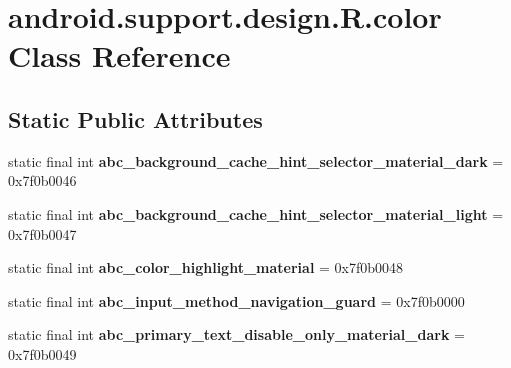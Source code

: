 \hypertarget{classandroid_1_1support_1_1design_1_1_r_1_1color}{}\section{android.\+support.\+design.\+R.\+color Class Reference}
\label{classandroid_1_1support_1_1design_1_1_r_1_1color}
\subsection*{Static Public Attributes}
\begin{DoxyCompactItemize}
\item 
\hypertarget{classandroid_1_1support_1_1design_1_1_r_1_1color_a3bc2369d5b8b40574722eba1c4ed66e8}{}static final int {\bfseries abc\+\_\+background\+\_\+cache\+\_\+hint\+\_\+selector\+\_\+material\+\_\+dark} = 0x7f0b0046\label{classandroid_1_1support_1_1design_1_1_r_1_1color_a3bc2369d5b8b40574722eba1c4ed66e8}

\item 
\hypertarget{classandroid_1_1support_1_1design_1_1_r_1_1color_a836a7fae9079ef65b027b79704cebc14}{}static final int {\bfseries abc\+\_\+background\+\_\+cache\+\_\+hint\+\_\+selector\+\_\+material\+\_\+light} = 0x7f0b0047\label{classandroid_1_1support_1_1design_1_1_r_1_1color_a836a7fae9079ef65b027b79704cebc14}

\item 
\hypertarget{classandroid_1_1support_1_1design_1_1_r_1_1color_aa538e5e8510d682489fe209c4455e24a}{}static final int {\bfseries abc\+\_\+color\+\_\+highlight\+\_\+material} = 0x7f0b0048\label{classandroid_1_1support_1_1design_1_1_r_1_1color_aa538e5e8510d682489fe209c4455e24a}

\item 
\hypertarget{classandroid_1_1support_1_1design_1_1_r_1_1color_a6bc1f7e07ac7632cfbed86d43f972968}{}static final int {\bfseries abc\+\_\+input\+\_\+method\+\_\+navigation\+\_\+guard} = 0x7f0b0000\label{classandroid_1_1support_1_1design_1_1_r_1_1color_a6bc1f7e07ac7632cfbed86d43f972968}

\item 
\hypertarget{classandroid_1_1support_1_1design_1_1_r_1_1color_ad8fbdd5eadbb720a1389509088e6feeb}{}static final int {\bfseries abc\+\_\+primary\+\_\+text\+\_\+disable\+\_\+only\+\_\+material\+\_\+dark} = 0x7f0b0049\label{classandroid_1_1support_1_1design_1_1_r_1_1color_ad8fbdd5eadbb720a1389509088e6feeb}


\end{DoxyCompactItemize}
